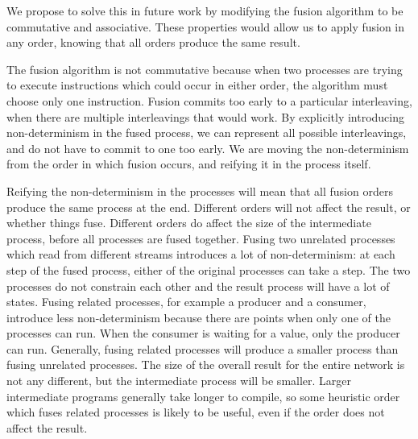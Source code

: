 We propose to solve this in future work  by modifying the fusion algorithm to be commutative and associative.
These properties would allow us to apply fusion in any order, knowing that all orders produce the same result.

The fusion algorithm is not commutative because when two processes are trying to execute instructions which could occur in either order, the algorithm must choose only one instruction.
Fusion commits too early to a particular interleaving, when there are multiple interleavings that would work.
By explicitly introducing non-determinism in the fused process, we can represent all possible interleavings, and do not have to commit to one too early.
We are moving the non-determinism from the order in which fusion occurs, and reifying it in the process itself.

Reifying the non-determinism in the processes will mean that all fusion orders produce the same process at the end.
Different orders will not affect the result, or whether things fuse.
Different orders do affect the size of the intermediate process, before all processes are fused together.
Fusing two unrelated processes which read from different streams introduces a lot of non-determinism: at each step of the fused process, either of the original processes can take a step.
The two processes do not constrain each other and the result process will have a lot of states.
Fusing related processes, for example a producer and a consumer, introduce less non-determinism because there are points when only one of the processes can run.
When the consumer is waiting for a value, only the producer can run.
Generally, fusing related processes will produce a smaller process than fusing unrelated processes.
The size of the overall result for the entire network is not any different, but the intermediate process will be smaller.
Larger intermediate programs generally take longer to compile, so some heuristic order which fuses related processes is likely to be useful, even if the order does not affect the result.




